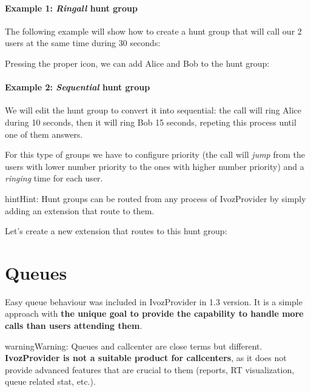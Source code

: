 \documentclass[letterpaper,10pt,english]{sphinxmanual}
\begin{document}
\paragraph{Example 1: \emph{Ringall} hunt group}

The following example will show how to create a hunt group that will call our 2
users at the same time during 30 seconds:

\noindent{}

Pressing the proper icon, we can add Alice and Bob to the hunt group:

\noindent{}
\paragraph{Example 2: \emph{Sequential} hunt group}

We will edit the hunt group to convert it into sequential: the call will ring
Alice during 10 seconds, then it will ring Bob 15 seconds, repeting this process
until one of them answers.

\noindent{}

For this type of groups we have to configure priority (the call will \emph{jump}
from the users with lower number priority to the ones with higher number
priority) and a \emph{ringing} time for each user.

\noindent{}

\begin{notice}{hint}{Hint:}
Hunt groups can be routed from any process of IvozProvider by simply
adding an extension that route to them.
\end{notice}

Let's create a new extension that routes to this hunt group:

\noindent{}


\section{Queues}
\label{pbx_features/queues:queues}\label{pbx_features/queues::doc}
Easy queue behaviour was included in IvozProvider in 1.3 version. It is a simple
approach with \textbf{the unique goal to provide the capability to handle more calls
than users attending them}.

\begin{notice}{warning}{Warning:}
Queues and callcenter are close terms but different. \textbf{IvozProvider
is not a suitable product for callcenters}, as it does not provide
advanced features that are crucial to them (reports, RT visualization,
queue related stat, etc.).
\end{notice}
\end{document}
